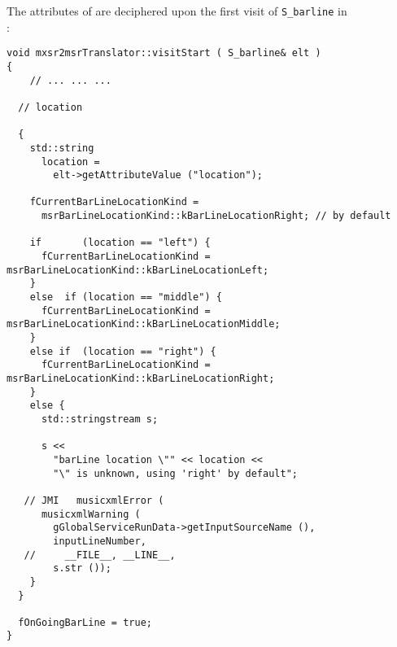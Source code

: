 The attributes of  are deciphered upon the first visit of {\tt S_barline} in\\
:%
\begin{lstlisting}[language=CPlusPlus]
void mxsr2msrTranslator::visitStart ( S_barline& elt )
{
	// ... ... ...

  // location

  {
    std::string
      location =
        elt->getAttributeValue ("location");

    fCurrentBarLineLocationKind =
      msrBarLineLocationKind::kBarLineLocationRight; // by default

    if       (location == "left") {
      fCurrentBarLineLocationKind = msrBarLineLocationKind::kBarLineLocationLeft;
    }
    else  if (location == "middle") {
      fCurrentBarLineLocationKind = msrBarLineLocationKind::kBarLineLocationMiddle;
    }
    else if  (location == "right") {
      fCurrentBarLineLocationKind = msrBarLineLocationKind::kBarLineLocationRight;
    }
    else {
      std::stringstream s;

      s <<
        "barLine location \"" << location <<
        "\" is unknown, using 'right' by default";

   // JMI   musicxmlError (
      musicxmlWarning (
        gGlobalServiceRunData->getInputSourceName (),
        inputLineNumber,
   //     __FILE__, __LINE__,
        s.str ());
    }
  }

  fOnGoingBarLine = true;
}
\end{lstlisting}

